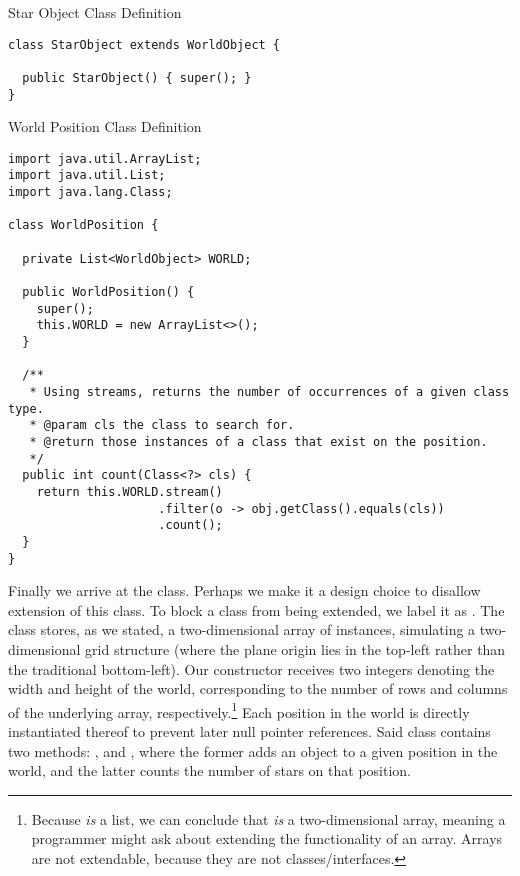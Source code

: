 \begin{cl}{Star Object Class Definition}
\begin{lstlisting}[language=MyJava]
class StarObject extends WorldObject {
  
  public StarObject() { super(); }
}
\end{lstlisting}
\end{cl}

\begin{cl}{World Position Class Definition}
\begin{lstlisting}[language=MyJava]
import java.util.ArrayList;
import java.util.List;
import java.lang.Class;

class WorldPosition {

  private List<WorldObject> WORLD;

  public WorldPosition() { 
    super(); 
    this.WORLD = new ArrayList<>();  
  }

  /**
   * Using streams, returns the number of occurrences of a given class type.
   * @param cls the class to search for.
   * @return those instances of a class that exist on the position.
   */
  public int count(Class<?> cls) {
    return this.WORLD.stream()
                     .filter(o -> obj.getClass().equals(cls))
                     .count();
  }
}
\end{lstlisting}
\end{cl}

Finally we arrive at the  class. Perhaps we make it a design choice to disallow extension of this class. To block a class from being extended, we label it as . The  class stores, as we stated, a two-dimensional array of  instances, simulating a two-dimensional grid structure (where the plane origin lies in the top-left rather than the traditional bottom-left). Our constructor receives two integers denoting the width and height of the world, corresponding to the number of rows and columns of the underlying array, respectively.\footnote{Because  \textit{is} a list, we can conclude that  \textit{is} a two-dimensional array, meaning a programmer might ask about extending the functionality of an array. Arrays are not extendable, because they are not classes/interfaces.} Each position in the world is directly instantiated thereof to prevent later null pointer references. Said  class contains two methods: , and , where the former adds an object to a given position in the world, and the latter counts the number of stars on that position.

